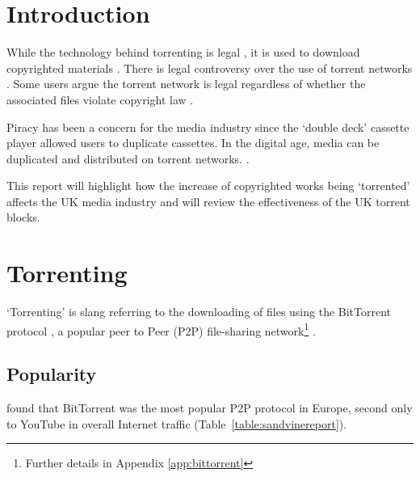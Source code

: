 
\tableofcontents
\listoffigures
\listoftables
\printglossaries

\clearpage


\section{Introduction} %

While the technology behind torrenting is legal \citep{MDE:MDE2634}, it is used to download copyrighted materials \citep{currentstateofbittorrent}. %
There is legal controversy over the use of torrent networks \citep{duah2013injunction}. Some users argue the \gls{torrent} network is legal regardless of whether the associated files violate copyright law \citep{piratebaylegal}.

Piracy has been a concern for the media industry since the `double deck' cassette player allowed users to duplicate cassettes. In the digital age, media can be duplicated and distributed on torrent networks. \citep{cameron2014audio, currentstateofbittorrent}.

This report will highlight how the increase of copyrighted works being `torrented' affects the UK media industry and will review the effectiveness of the UK torrent blocks.

\section{Torrenting} %

`Torrenting' is slang referring to the downloading of files using the BitTorrent protocol \citep{britannica}, a popular \Gls{peer} to Peer (P2P) file-sharing network\footnote{Further details in Appendix \ref{app:bittorrent}} \citep{p2pmeasurements, cachelogictruep2p, cachelogicp2p2}. 

\subsection{Popularity}

\citet{sandvinereport} found that BitTorrent was the most popular P2P protocol in Europe, second only to YouTube in overall Internet traffic (Table~\ref{table:sandvinereport}).

